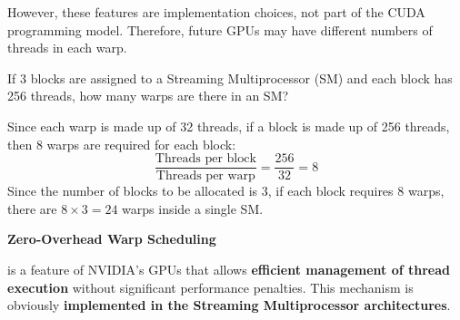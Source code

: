 \noindent
However, these features are implementation choices, not part of the CUDA programming model. Therefore, future GPUs may have different numbers of threads in each warp.

\highspace
\begin{examplebox}[: Warp]
    If 3 blocks are assigned to a Streaming Multiprocessor (SM) and each block has 256 threads, how many warps are there in an SM?

    Since each warp is made up of 32 threads, if a block is made up of 256 threads, then 8 warps are required for each block:
    \begin{equation*}
        \dfrac{\text{Threads per block}}{\text{Threads per warp}} = \dfrac{256}{32} = 8
    \end{equation*}
    Since the number of blocks to be allocated is 3, if each block requires 8 warps, there are $8 \times 3 = 24$ warps inside a single SM.
\end{examplebox}

\newpage

\begin{flushleft}
    \textcolor{Green3}{ \textbf{Zero-Overhead Warp Scheduling}}\cite{EECS570Lecture5ZeroOverheadWarpScheduling}
\end{flushleft}
 is a feature of NVIDIA's GPUs that allows \textbf{efficient management of thread execution} without significant performance penalties. This mechanism is obviously \textbf{implemented in the Streaming Multiprocessor architectures}.

